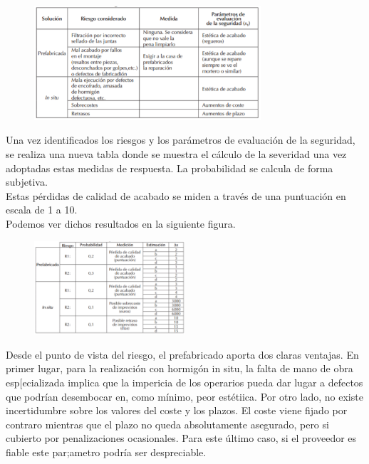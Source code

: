 \documentclass[10pt]{article}
\begin{document}
\begin{figure}[H]
	\begin{center}
 		\includegraphics[width = 0.75\textwidth]{Imagenes/img8.eps}
	\end{center} 
\end{figure}

Una vez identificados los riesgos y los parámetros de evaluación de la seguridad, se realiza una nueva tabla donde se muestra el cálculo de la severidad una vez adoptadas estas medidas de respuesta. La probabilidad se calcula de forma subjetiva.\\

Estas pérdidas de calidad de acabado se miden a través de una puntuación en escala de 1 a 10. \\

Podemos ver dichos resultados en la siguiente figura.

\begin{figure}[H]
	\begin{center}
 		\includegraphics[width = 0.5\textwidth]{Imagenes/img9.eps}
	\end{center} 
\end{figure}

Desde el punto de vista del riesgo, el prefabricado aporta dos claras ventajas. En primer lugar, para la realización con hormigón in situ, la falta de mano de obra esp[ecializada implica que la impericia de los operarios pueda dar lugar a defectos que podrían desembocar en, como mínimo, peor estétiica. Por otro lado, no existe incertidumbre sobre los valores del coste y los plazos. El coste viene fijado por contraro mientras que el plazo no queda absolutamente asegurado, pero si cubierto por penalizaciones ocasionales. Para este último caso, si el proveedor es fiable este par;ametro podría ser despreciable. \\
\end{document}
